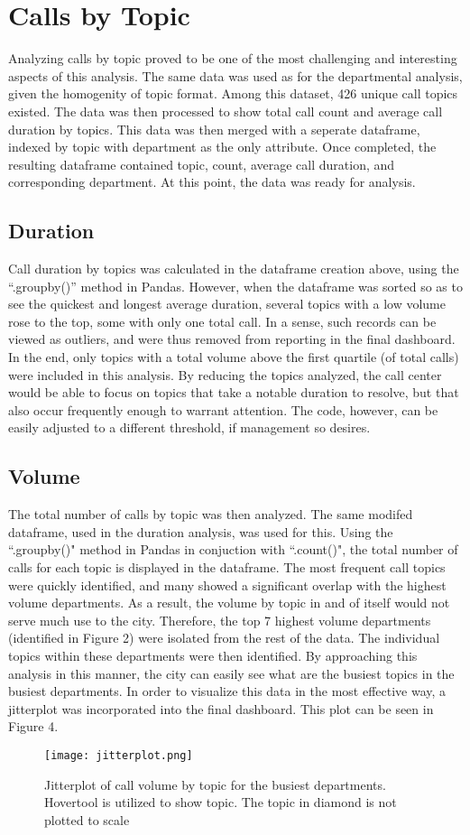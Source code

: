 \documentclass[11pt,twocolumn]{article}
\begin{document}
\section{Calls by Topic}
Analyzing calls by topic proved to be one of the most challenging and interesting aspects of this analysis.  The same data was used as for the departmental analysis, given the homogenity of topic format.  Among this dataset, 426 unique call topics existed.  The data was then processed to show total call count and average call duration by topics.  This data was then merged with a seperate dataframe, indexed by topic with department as the only attribute.  Once completed, the resulting dataframe contained topic, count, average call duration, and corresponding department.  At this point, the data was ready for analysis.

\subsection{Duration}
Call duration by topics was calculated in the dataframe creation above, using the ``.groupby()'' method in Pandas.  However, when the dataframe was sorted so as to see the quickest and longest average duration, several topics with a low volume rose to the top, some with only one total call.  In a sense, such records can be viewed as outliers, and were thus removed from reporting in the final dashboard.  In the end, only topics with a total volume above the first quartile (of total calls) were included in this analysis.  By reducing the topics analyzed, the call center would be able to focus on topics that take a notable duration to resolve, but that also occur frequently enough to warrant attention.  The code, however, can be easily adjusted to a different threshold, if management so desires.

\subsection{Volume}
The total number of calls by topic was then analyzed.  The same modifed dataframe, used in the duration analysis, was used for this.  Using the ``.groupby()" method in Pandas in conjuction with ``.count()", the total number of calls for each topic is displayed in the dataframe.  The most frequent call topics were quickly identified, and many showed a significant overlap with the highest volume departments.  As a result, the volume by topic in and of itself would not serve much use to the city.  Therefore, the top 7 highest volume departments (identified in Figure 2) were isolated from the rest of the data.  The individual topics within these departments were then identified.  By approaching this analysis in this manner, the city can easily see what are the busiest topics in the busiest departments.  In order to visualize this data in the most effective way, a jitterplot was incorporated into the final dashboard.  This plot can be seen in Figure 4.
\begin{figure}[h]
  \texttt{[image: jitterplot.png]}
  \caption{Jitterplot of call volume by topic for the busiest departments.  Hovertool is utilized to show topic.  The topic in diamond is not plotted to scale}
\end{figure}
\end{document}
